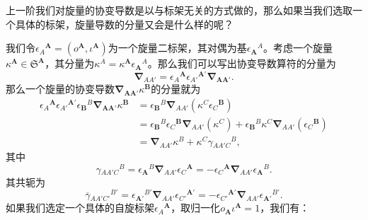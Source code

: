 上一阶我们对旋量的协变导数是以与标架无关的方式做的，那么如果当我们选取一个具体的标架，旋量导数的分量又会是什么样的呢？



我们令$\epsilon {_{A}}^{\boldsymbol{A}} =(o^{\boldsymbol{A}} ,\iota ^{\boldsymbol{A}} )$为一个旋量二标架，其对偶为基$\epsilon {_{\boldsymbol{A}}}^{A}$。考虑一个旋量$\kappa ^{\boldsymbol{A}} \in \mathfrak{S}^{\boldsymbol{A}}$，其分量为$\kappa ^{A} =\kappa ^{\boldsymbol{A}} \epsilon {_{\boldsymbol{A}}}^{A}$。那么我们可以写出协变导数算符的分量为
\begin{equation*}
	\boldsymbol{\nabla }_{AA'} =\epsilon {_{A}}^{\boldsymbol{A}} \epsilon {_{A'}}^{\boldsymbol{A} '}\boldsymbol{\nabla }_{\boldsymbol{AA} '} .
\end{equation*}
那么一个旋量的协变导数$\boldsymbol{\nabla }_{\boldsymbol{AA} '} \kappa ^{\boldsymbol{B}}$的分量就为
\begin{equation*}
	\begin{aligned}
		\epsilon {_{A}}^{\boldsymbol{A}} \epsilon {_{A'}}^{\boldsymbol{A} '} \epsilon {_{\boldsymbol{B}}}^{B}\boldsymbol{\nabla }_{\boldsymbol{AA} '} \kappa ^{\boldsymbol{B}} & =\epsilon {_{\boldsymbol{B}}}^{B}\boldsymbol{\nabla }_{AA'} (\kappa ^{C} \epsilon {_{C}}^{\boldsymbol{B}} )\\
		& =\epsilon {_{\boldsymbol{B}}}^{B} \epsilon {_{C}}^{\boldsymbol{B}}\boldsymbol{\nabla }_{AA'} (\kappa ^{C} )+\epsilon {_{\boldsymbol{B}}}^{B} \kappa ^{C}\boldsymbol{\nabla }_{AA'} (\epsilon {_{C}}^{\boldsymbol{B}} )\\
		& =\boldsymbol{\nabla }_{AA'} \kappa ^{B} +\kappa ^{C} \gamma {_{AA'C}}^{B} ,
	\end{aligned}
\end{equation*}
其中
\begin{equation}
	\gamma {_{AA'C}}^{B} =\epsilon {_{\boldsymbol{A}}}^{B}\boldsymbol{\nabla }_{AA'} \epsilon {_{C}}^{\boldsymbol{A}} =-\epsilon {_{C}}^{\boldsymbol{A}}\boldsymbol{\nabla }_{AA'} \epsilon {_{\boldsymbol{A}}}^{B} .
	\label{eq:5.42}
\end{equation}
其共轭为
\begin{equation*}
	\overline{\gamma }{_{AA'C'}}^{B'} =\epsilon {_{\boldsymbol{A} '}}^{B'}\boldsymbol{\nabla }_{AA'} \epsilon {_{C'}}^{\boldsymbol{A} '} =-\epsilon {_{C'}}^{\boldsymbol{A} '}\boldsymbol{\nabla }_{AA'} \epsilon {_{\boldsymbol{A} '}}^{B'} .
\end{equation*}
如果我们选定一个具体的自旋标架$\epsilon {_{A}}^{\boldsymbol{A}}$，取归一化$o_{\boldsymbol{A}} \iota ^{\boldsymbol{A}} =1$，我们有：
